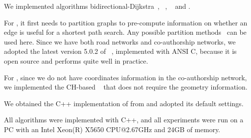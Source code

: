 
 We implemented algorithms bidirectional-Dijkstra~\cite{LubyR89}, \arcflag~\cite{MohringSSWW05}, \tnr~\cite{arz2013transit} and \ah \cite{zhu2013shortest}.

For \arcflag, it first needs to partition graphs to pre-compute information on whether an edge is useful for a shortest path search. Any possible partition methods~\cite{kl70,Karypis98,YangYZK12, delling2011graph} can be used here. Since we have both road networks and co-authorship networks, we adopted the latest version 5.0.2 of \metis~\cite{metis}, implemented with ANSI C, because it is open source and performs quite well in practice.

For \tnr, since we do not have coordinates information in the co-authorship network, we implemented the CH-based \tnr~\cite{arz2013transit} that does not require the geometry information.

We obtained the C++ implementation of \ah from \cite{zhu2013shortest} and adopted its default settings.



 All algorithms were implemented with C++, and
all experiments were run on a PC with an Intel Xeon(R) X5650 CPU@2.67GHz
and 24GB of memory.






